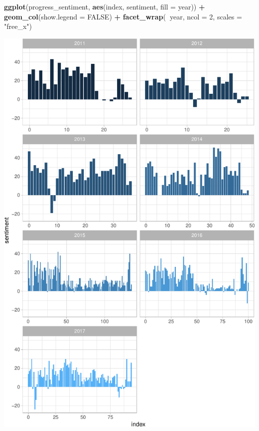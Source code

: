 \documentclass[12pt,a4paper]{article}
\newenvironment{Shaded}{\begin{snugshade}}{\end{snugshade}}
\newcommand{\KeywordTok}[1]{\textcolor[rgb]{0.13,0.29,0.53}{\textbf{#1}}}
\newcommand{\DataTypeTok}[1]{\textcolor[rgb]{0.13,0.29,0.53}{#1}}
\newcommand{\DecValTok}[1]{\textcolor[rgb]{0.00,0.00,0.81}{#1}}
\newcommand{\StringTok}[1]{\textcolor[rgb]{0.31,0.60,0.02}{#1}}
\newcommand{\OtherTok}[1]{\textcolor[rgb]{0.56,0.35,0.01}{#1}}
\newcommand{\OperatorTok}[1]{\textcolor[rgb]{0.81,0.36,0.00}{\textbf{#1}}}
\newcommand{\NormalTok}[1]{#1}
\begin{document}
\begin{Shaded}
\begin{Highlighting}[]
\KeywordTok{ggplot}\NormalTok{(progress_sentiment, }\KeywordTok{aes}\NormalTok{(index, sentiment, }\DataTypeTok{fill =}\NormalTok{ year)) }\OperatorTok{+}
\StringTok{  }\KeywordTok{geom_col}\NormalTok{(}\DataTypeTok{show.legend =} \OtherTok{FALSE}\NormalTok{) }\OperatorTok{+}
\StringTok{  }\KeywordTok{facet_wrap}\NormalTok{(}\OperatorTok{~}\NormalTok{year, }\DataTypeTok{ncol =} \DecValTok{2}\NormalTok{, }\DataTypeTok{scales =} \StringTok{"free_x"}\NormalTok{)}
\end{Highlighting}
\end{Shaded}

\includegraphics{progressSUN_files/figure-latex/unnamed-chunk-7-1.pdf}
\end{document}
